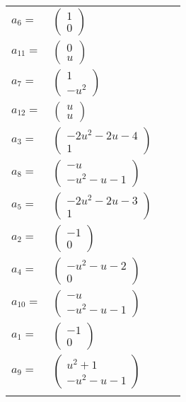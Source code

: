 \documentclass[1p]{elsarticle_modified}
\theoremstyle{definition}
\begin{document}
\begin{tabular}{m{7pt} m{180pt} m{7pt} m{180pt} }
\flushright $a_{6}=$&$\begin{pmatrix}1\\0\end{pmatrix}$ \\
\flushright $a_{11}=$&$\begin{pmatrix}0\\u\end{pmatrix}$ \\
\flushright $a_{7}=$&$\begin{pmatrix}1\\- u^2\end{pmatrix}$ \\
\flushright $a_{12}=$&$\begin{pmatrix}u\\u\end{pmatrix}$ \\
\flushright $a_{3}=$&$\begin{pmatrix}-2 u^2-2 u-4\\1\end{pmatrix}$ \\
\flushright $a_{8}=$&$\begin{pmatrix}- u\\- u^2- u-1\end{pmatrix}$ \\
\flushright $a_{5}=$&$\begin{pmatrix}-2 u^2-2 u-3\\1\end{pmatrix}$ \\
\flushright $a_{2}=$&$\begin{pmatrix}-1\\0\end{pmatrix}$ \\
\flushright $a_{4}=$&$\begin{pmatrix}- u^2- u-2\\0\end{pmatrix}$ \\
\flushright $a_{10}=$&$\begin{pmatrix}- u\\- u^2- u-1\end{pmatrix}$ \\
\flushright $a_{1}=$&$\begin{pmatrix}-1\\0\end{pmatrix}$ \\
\flushright $a_{9}=$&$\begin{pmatrix}u^2+1\\- u^2- u-1\end{pmatrix}$\\&\end{tabular}
\end{document}
